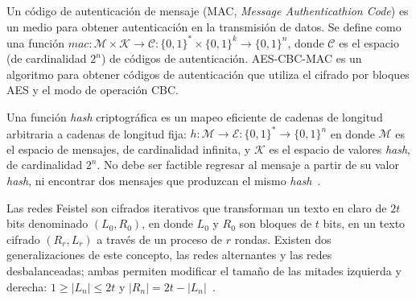 Un código de autenticación de mensaje (MAC, \textit{Message Authenticathion
Code}) es un medio para obtener autenticación en la transmisión de datos. Se
define como una función $ mac: \mathcal{M} \times \mathcal{K} \rightarrow
\mathcal{C} : \{ 0, 1 \}^* \times \{ 0, 1 \}^k \rightarrow \{ 0, 1 \}^n $,
donde $ \mathcal{C} $ es el espacio (de cardinalidad $ 2^n $) de códigos de
autenticación. AES-CBC-MAC es un algoritmo para obtener códigos de autenticación
que utiliza el cifrado por bloques AES y el modo de operación CBC.

Una función \textit{hash} criptográfica es un mapeo eficiente de cadenas de
longitud arbitraria a cadenas de longitud fija: $ h: \mathcal{M} \rightarrow
\mathcal{E} : \{ 0, 1 \}^* \rightarrow \{ 0, 1 \}^n $ en donde $ \mathcal{M} $
es el espacio de mensajes, de cardinalidad infinita, y $ \mathcal{K} $ es el
espacio de valores \textit{hash}, de cardinalidad $ 2^n $. No debe ser factible
regresar al mensaje a partir de su valor \textit{hash}, ni encontrar dos
mensajes que produzcan el mismo \textit{hash}~\cite{menezes}.


Las redes Feistel son cifrados iterativos que transforman un texto en claro de $
2t $ bits denominado $ (L_0, R_0) $, en donde $ L_0 $ y $ R_0 $ son bloques de $
t $ bits, en un texto cifrado $ (R_r, L_r) $ a través de un proceso de $ r $
rondas. Existen dos generalizaciones de este concepto, las redes alternantes y
las redes desbalanceadas; ambas permiten modificar el tamaño de las mitades
izquierda y derecha: $ 1 \geq | L_n | \leq 2t $ y $ | R_n | = 2t - | L_n |
$~\cite{DBLP:conf/fse/SchneierK96, DBLP:conf/fse/AndersonB96a}.


